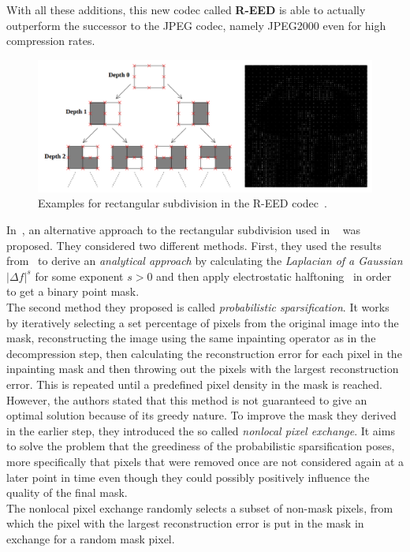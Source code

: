 With all these additions, this new codec called \textbf{R-EED} is able to actually outperform the
successor to the JPEG codec, namely JPEG2000 even for high compression rates.
\begin{figure}[ht]
    \centering
    \includegraphics[width=0.8\linewidth]{../Images/tree_trui.png}
    \caption{Examples for rectangular subdivision in the R-EED codec~\cite{schmaltz09}.}
\end{figure}
In~\cite{hoeltgen12}, an alternative approach to the rectangular subdivision used in
~\cite{schmaltz09} was proposed. They considered two different methods. First, they used the results
from~\cite{belhachmi09} to derive an \textit{analytical approach} by calculating the \textit{Laplacian of a
Gaussian} $\vert \Delta f \vert^s$ for some exponent $s>0$ and then apply electrostatic 
halftoning~\cite{electrostatic} in order to get a binary point mask.\\
The second method they proposed is called \textit{probabilistic sparsification}. It works by
iteratively selecting a set percentage of pixels from the original image into the mask,
reconstructing the image using the same inpainting operator as in the decompression step, then
calculating the reconstruction error for each pixel in the inpainting mask and then throwing out
the pixels with the largest reconstruction error. This is repeated until a predefined pixel
density in the mask is reached. However, the authors stated that this method is not guaranteed to
give an optimal solution because of its greedy nature. To improve the mask they derived in the
earlier step, they introduced the so called \textit{nonlocal pixel exchange}. It aims to solve the
problem that the greediness of the probabilistic sparsification poses, more specifically that
pixels that were removed once are not considered again at a later point in time even though they
could possibly positively influence the quality of the final mask.\\
The nonlocal pixel exchange randomly selects a subset of non-mask pixels, from which the pixel with
the largest reconstruction error is put in the mask in exchange for a random mask pixel.
